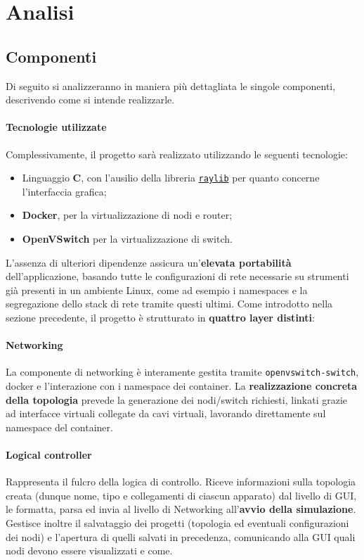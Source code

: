 \section{Analisi}
\subsection{Componenti}
Di seguito si analizzeranno in maniera più dettagliata le singole componenti, descrivendo come si intende realizzarle. 
\paragraph*{Tecnologie utilizzate} Complessivamente, il progetto sarà realizzato utilizzando le seguenti tecnologie: 
\begin{itemize}
    \item Linguaggio \textbf{C}, con l'ausilio della libreria \href{https://github.com/raysan5/raylib}{\texttt{raylib}} per quanto concerne l'interfaccia grafica;
    \item \textbf{Docker}, per la virtualizzazione di nodi e router;
    \item \textbf{OpenVSwitch} per la virtualizzazione di switch. 
\end{itemize}
L'assenza di ulteriori dipendenze assicura un'\textbf{elevata portabilità} dell'applicazione, basando tutte le configurazioni di rete necessarie su strumenti già presenti in un ambiente Linux, come ad esempio i namespaces e la segregazione dello stack di rete tramite questi ultimi. 
\newline\newline
Come introdotto nella sezione precedente, il progetto è strutturato in \textbf{quattro layer distinti}:
\paragraph*{Networking} La componente di networking è interamente gestita tramite \texttt{openvswitch-switch}, docker e l'interazione con i namespace dei container. La \textbf{realizzazione concreta della topologia} prevede la generazione dei nodi/switch richiesti, linkati grazie ad interfacce virtuali collegate da cavi virtuali, lavorando direttamente sul namespace del container. 
\paragraph*{Logical controller} Rappresenta il fulcro della logica di controllo. Riceve informazioni sulla topologia creata (dunque nome, tipo e collegamenti di ciascun apparato) dal livello di GUI, le formatta, parsa ed invia al livello di Networking all'\textbf{avvio della simulazione}. Gestisce inoltre il salvataggio dei progetti (topologia ed eventuali configurazioni dei nodi) e l'apertura di quelli salvati in precedenza, comunicando alla GUI quali nodi devono essere visualizzati e come. 
